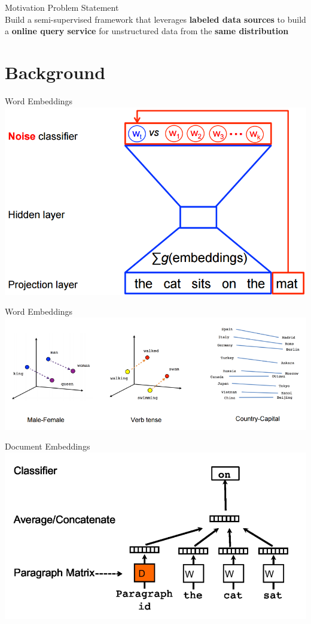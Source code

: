 \documentclass[aspectratio=169]{beamer}
\begin{document}
\begin{frame}{Motivation}
	\centering
	{\Huge Problem Statement} \\
	\vspace{1cm}
	{\Large Build a semi-supervised framework that leverages \textbf{labeled data sources} to build a \textbf{online query service} for unstructured data from the \textbf{same distribution}}
\end{frame}

\section{Background}

\begin{frame}{Word Embeddings}
	\centering
	\includegraphics[width=.7\textwidth]{images/word2vec-1.png}
\end{frame}

\begin{frame}{Word Embeddings}
	\centering
	\includegraphics[width=.9\textwidth]{images/word2vec-2.png}
\end{frame}

\begin{frame}{Document Embeddings}
	\centering
	\includegraphics[width=.7\textwidth]{images/docvec.png}
\end{frame}
\end{document}
